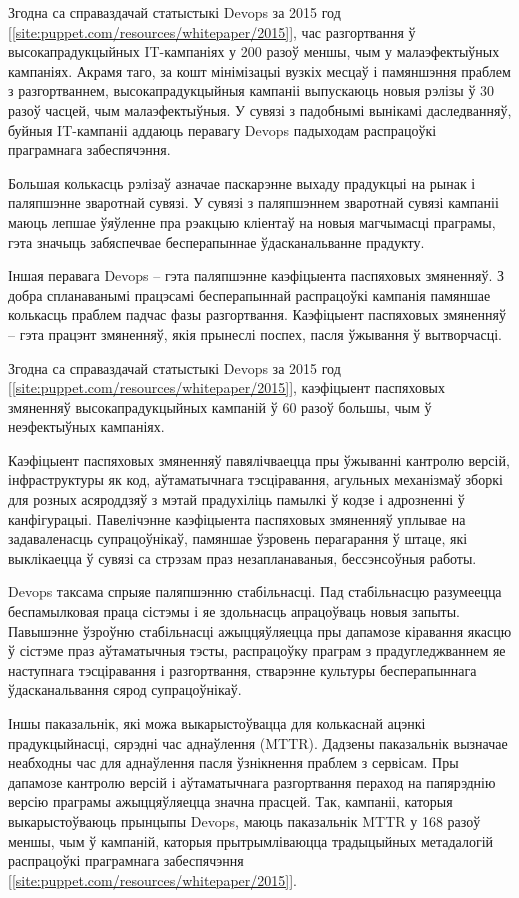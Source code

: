 Згодна са справаздачай статыстыкі Devops за 2015 год%
[\ref{site:puppet.com/resources/whitepaper/2015}],
час разгортвання ў высокапрадукцыйных IT-кампаніях у 200 разоў
меншы, чым у малаэфектыўных кампаніях.
Акрамя таго, за кошт мінімізацыі вузкіх месцаў і памяншэння
праблем з разгортваннем, высокапрадукцыйныя кампаніі
выпускаюць новыя рэлізы ў 30 разоў часцей, чым малаэфектыўныя.
У сувязі з падобнымі вынікамі даследванняў, буйныя IT-кампаніі
аддаюць перавагу Devops падыходам распрацоўкі праграмнага забеспячэння.

Большая колькасць рэлізаў азначае паскарэнне выхаду прадукцыі на рынак
і паляпшэнне зваротнай сувязі. У сувязі з паляпшэннем зваротнай сувязі
кампаніі маюць лепшае ўяўленне пра рэакцыю кліентаў на новыя магчымасці
праграмы, гэта значыць забяспечвае бесперапыннае ўдасканальванне прадукту.

Іншая перавага Devops -- гэта паляпшэнне каэфіцыента паспяховых змяненняў.
З добра спланаванымі працэсамі бесперапыннай распрацоўкі кампанія памяншае
колькасць праблем падчас фазы разгортвання.
Каэфіцыент паспяховых змяненняў -- гэта працэнт змяненняў, якія прынеслі
поспех, пасля ўжывання ў вытворчасці.

Згодна са справаздачай статыстыкі Devops за 2015 год%
[\ref{site:puppet.com/resources/whitepaper/2015}],
каэфіцыент паспяховых змяненняў высокапрадукцыйных кампаній
ў 60 разоў большы, чым ў неэфектыўных кампаніях.

Каэфіцыент паспяховых змяненняў павялічваецца пры ўжыванні
кантролю версій, інфраструктуры як код, аўтаматычнага
тэсціравання, агульных механізмаў зборкі для розных
асяроддзяў з мэтай прадухіліць памылкі ў кодзе і
адрозненні ў канфігурацыі.
Павелічэнне каэфіцыента паспяховых змяненняў
уплывае на задаваленасць супрацоўнікаў, памяншае
ўзровень перагарання ў штаце, які выклікаецца ў сувязі са
стрэзам праз незапланаваныя, бессэнсоўныя работы.

Devops таксама спрыяе паляпшэнню стабільнасці.
Пад стабільнасцю разумеецца беспамылковая праца сістэмы і
яе здольнасць апрацоўваць новыя запыты.
Павышэнне ўзроўню стабільнасці ажыццяўляецца пры дапамозе
кіравання якасцю ў сістэме праз аўтаматычныя тэсты,
распрацоўку праграм з прадугледжваннем яе наступнага тэсціравання і
разгортвання, стварэнне культуры бесперапыннага ўдасканальвання сярод
супрацоўнікаў.

Іншы паказальнік, які можа выкарыстоўвацца для колькаснай ацэнкі
прадукцыйнасці, сярэдні час аднаўлення (MTTR). Дадзены паказальнік
вызначае неабходны час для аднаўлення пасля ўзнікнення праблем з сервісам.
Пры дапамозе кантролю версій і аўтаматычнага разгортвання пераход на
папярэднію версію праграмы ажыццяўляецца значна прасцей. Так, кампаніі,
каторыя выкарыстоўваюць прынцыпы Devops, маюць паказальнік MTTR у
168 разоў меншы, чым ў кампаній, каторыя прытрымліваюцца
традыцыйных метадалогій распрацоўкі праграмнага забеспячэння%
[\ref{site:puppet.com/resources/whitepaper/2015}].


